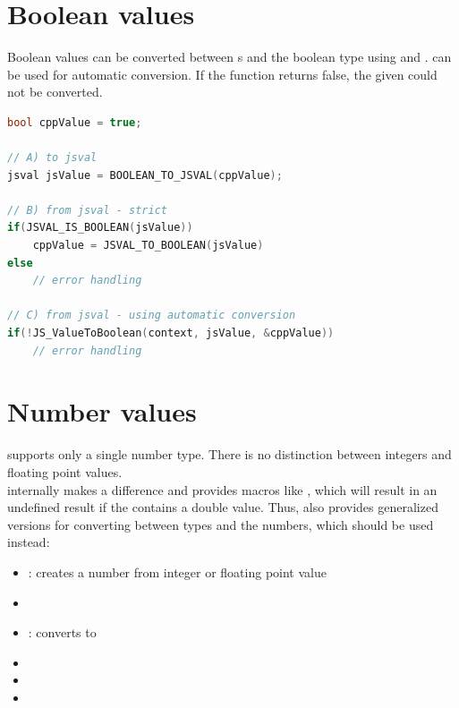 \section{Boolean values}

Boolean values can be converted between s and the  boolean type using  and .  can be used for automatic conversion. If the function returns false, the given  could not be converted.

\SingleSpacing
\begin{lstlisting}[language=C++, caption=Conversion of boolean values]
bool cppValue = true;

// A) to jsval
jsval jsValue = BOOLEAN_TO_JSVAL(cppValue);

// B) from jsval - strict
if(JSVAL_IS_BOOLEAN(jsValue))
	cppValue = JSVAL_TO_BOOLEAN(jsValue)
else
	// error handling
	
// C) from jsval - using automatic conversion
if(!JS_ValueToBoolean(context, jsValue, &cppValue))
	// error handling
\end{lstlisting}
\OnehalfSpacing

\section{Number values}

 supports only a single number type. There is no distinction between integers and floating point values.\\
 internally makes a difference and provides macros like , which will result in an undefined result if the  contains a double value. Thus,  also provides generalized versions for converting between  types and the  numbers, which should be used instead:

\begin{itemize}\addtolength{\itemsep}{-0.5\baselineskip}
	\item {}: creates a number  from integer or floating point value
	\item {}
	\item {}: converts to 
	\item {}
	\item {}
	\item {}
\end{itemize}

